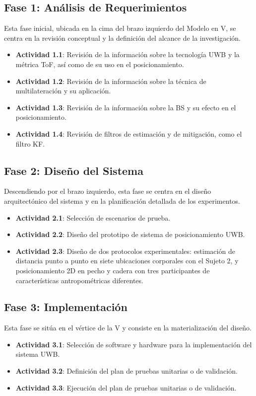 \subsection{Fase 1: Análisis de Requerimientos}
Esta fase inicial, ubicada en la cima del brazo izquierdo del Modelo en V, se centra en la revisión conceptual y la definición del alcance de la investigación.
\begin{itemize}
    \item \textbf{Actividad 1.1}: Revisión de la información sobre la tecnología UWB y la métrica ToF, así como de su uso en el posicionamiento.
    \item \textbf{Actividad 1.2}: Revisión de la información sobre la técnica de multilateración y su aplicación.
    \item \textbf{Actividad 1.3}: Revisión de la información sobre la BS y su efecto en el posicionamiento.
    \item \textbf{Actividad 1.4}: Revisión de filtros de estimación y de mitigación, como el filtro KF.
\end{itemize}

\subsection{Fase 2: Diseño del Sistema}
Descendiendo por el brazo izquierdo, esta fase se centra en el diseño arquitectónico del sistema y en la planificación detallada de los experimentos.
\begin{itemize}
    \item \textbf{Actividad 2.1}: Selección de escenarios de prueba.
    \item \textbf{Actividad 2.2}: Diseño del prototipo de sistema de posicionamiento UWB.
    \item \textbf{Actividad 2.3}: Diseño de dos protocolos experimentales: estimación de distancia punto a punto en siete ubicaciones corporales con el Sujeto 2, y posicionamiento 2D en pecho y cadera con tres participantes de características antropométricas diferentes.
\end{itemize}

\subsection{Fase 3: Implementación}
Esta fase se sitúa en el vértice de la V y consiste en la materialización del diseño.
\begin{itemize}
    \item \textbf{Actividad 3.1}: Selección de software y hardware para la implementación del sistema UWB.
    \item \textbf{Actividad 3.2}: Definición del plan de pruebas unitarias o de validación. 
    \item \textbf{Actividad 3.3}: Ejecución del plan de pruebas unitarias o de validación.
\end{itemize}

